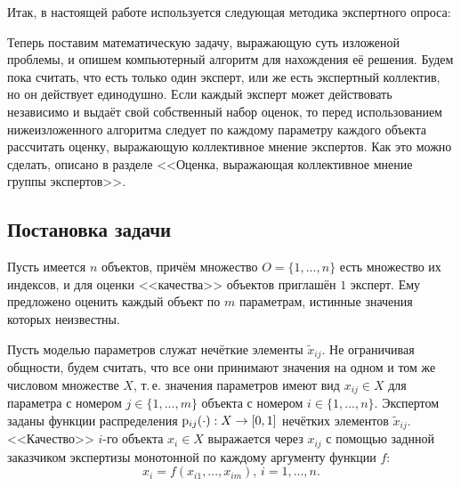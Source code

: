 \documentclass{article}
\begin{document}

Итак, в настоящей работе используется следующая методика экспертного опроса:
\begin{center}  \end{center}

Теперь поставим математическую задачу, выражающую суть изложеной проблемы, и опишем компьютерный алгоритм для нахождения её решения. Будем пока считать, что есть только один эксперт, или же есть экспертный коллектив, но он действует единодушно. Если каждый эксперт может действовать независимо и выдаёт свой собственный набор оценок, то перед использованием нижеизложенного алгоритма следует по каждому параметру каждого объекта рассчитать оценку, выражающую коллективное мнение экспертов. Как это можно сделать, описано в разделе <<Оценка, выражающая коллективное мнение группы экспертов>>.

\subsection{Постановка задачи}

Пусть имеется $n$ объектов, причём множество $O = \{1, ..., n\}$ есть множество их индексов, и для оценки <<качества>> объектов приглашён $1$ эксперт. Ему предложено оценить каждый объект по $m$ параметрам, истинные значения которых неизвестны. 

Пусть моделью параметров служат нечёткие элементы $\tilde x_{ij}$. Не ограничивая общности, будем считать, что все они принимают значения на одном и том же числовом множестве $X$, т.\,е. значения параметров имеют вид $x_{ij} \in X$ для параметра с номером $j \in \{1, ..., m\}$ объекта с номером $i \in \{1, ..., n\}$. Экспертом заданы функции распределения ${\mathrm{p}}_{ij}(\cdot): X \rightarrow [0,1]$ нечётких элементов $\tilde x_{ij}$. <<Качество>> $i$-го объекта $x_i \in X$ выражается через $x_{ij}$ с помощью заднной заказчиком экспертизы монотонной по каждому аргументу функции $f$:
\begin{equation}
  \label{e:function_f}
  x_i = f(x_{i1}, ..., x_{im}),\,i = 1, ..., n.
\end{equation}
\end{document}
